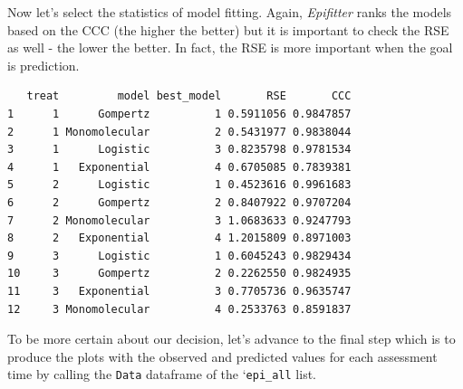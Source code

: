 \documentclass[
  letterpaper,
  DIV=11,
  numbers=noendperiod]{scrreprt}
\newenvironment{Shaded}{\begin{snugshade}}{\end{snugshade}}
\newcommand{\AttributeTok}[1]{\textcolor[rgb]{0.40,0.45,0.13}{#1}}
\newcommand{\CommentTok}[1]{\textcolor[rgb]{0.37,0.37,0.37}{#1}}
\newcommand{\DecValTok}[1]{\textcolor[rgb]{0.68,0.00,0.00}{#1}}
\newcommand{\FunctionTok}[1]{\textcolor[rgb]{0.28,0.35,0.67}{#1}}
\newcommand{\NormalTok}[1]{\textcolor[rgb]{0.00,0.23,0.31}{#1}}
\newcommand{\SpecialCharTok}[1]{\textcolor[rgb]{0.37,0.37,0.37}{#1}}
\newcommand{\StringTok}[1]{\textcolor[rgb]{0.13,0.47,0.30}{#1}}
\begin{document}
Now let's select the statistics of model fitting. Again,
\emph{Epifitter} ranks the models based on the CCC (the higher the
better) but it is important to check the RSE as well - the lower the
better. In fact, the RSE is more important when the goal is prediction.

\begin{Shaded}
\end{Shaded}

\begin{verbatim}
   treat         model best_model       RSE       CCC
1      1      Gompertz          1 0.5911056 0.9847857
2      1 Monomolecular          2 0.5431977 0.9838044
3      1      Logistic          3 0.8235798 0.9781534
4      1   Exponential          4 0.6705085 0.7839381
5      2      Logistic          1 0.4523616 0.9961683
6      2      Gompertz          2 0.8407922 0.9707204
7      2 Monomolecular          3 1.0683633 0.9247793
8      2   Exponential          4 1.2015809 0.8971003
9      3      Logistic          1 0.6045243 0.9829434
10     3      Gompertz          2 0.2262550 0.9824935
11     3   Exponential          3 0.7705736 0.9635747
12     3 Monomolecular          4 0.2533763 0.8591837
\end{verbatim}

To be more certain about our decision, let's advance to the final step
which is to produce the plots with the observed and predicted values for
each assessment time by calling the \texttt{Data} dataframe of the
`\texttt{epi\_all} list.

\begin{Shaded}
\end{Shaded}
\end{document}
